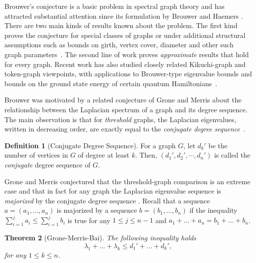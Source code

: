 \documentclass[10pt,reqno]{amsart}
\newtheorem{theorem}{Theorem}[section]
\theoremstyle{definition}
\newtheorem{definition}[theorem]{Definition}
\theoremstyle{remark}
\numberwithin{equation}{section}
\begin{document}
Brouwer's conjecture is a basic problem in spectral graph theory and has attracted substantial attention since its formulation by Brouwer and Haemers \cite{BrouwerHaemers2012,HaemersMohammadianTayfehRezaie2010}. There are two main kinds of results known about the problem. The first kind proves the conjecture for special classes of graphs\cite{HaemersMohammadianTayfehRezaie2010,FritscherHoppenRochaTrevisan2011,DuZhou2012,WangHuangLiu2012,Mayank2010,HelmbergTrevisan2017,TorresTrevisan2024} or under additional structural assumptions such as bounds on girth, vertex cover, diameter and other such graph parameters~\cite{GanieAlghamdiPirzada2016,Chen2018,Chen2019,GaniePirzadaRatherTrevisan2020,Cooper2021}. The second line of work proves \emph{approximate} results that hold for every graph\cite{Cooper2021,LewPartitionDensity2024,LewSumsDegrees2025,LewApproximate2026}. Recent work has also studied closely related Kikuchi-graph and token-graph viewpoints, with applications to Brouwer-type eigenvalue bounds and bounds on the ground state energy of certain quantum Hamiltonians~\cite{LewApproximate2026,BakshiBasuKothariLi2026}. 

Brouwer was motivated by a related conjecture of Grone and Merris about the relationship between the Laplacian spectrum of a graph and its degree sequence. The main observation is that for \emph{threshold} graphs, the Laplacian eigenvalues, written in decreasing order, are exactly equal to the \emph{conjugate degree sequence}~\cite{GroneMerrisSunder1990,Merris1994,HammerKelmans1996}. 

\begin{definition}[Conjugate Degree Sequence]
For a graph $G$, let $d_k'$ be the number of vertices in $G$ of degree at least $k$. Then, $(d_1', d_2', \cdots, d_n')$ is called the \emph{conjugate} degree sequence of $G$. 
\end{definition}

Grone and Merris conjectured that the threshold-graph comparison is an extreme case and that in fact for any graph the Laplacian eigenvalue sequence is \emph{majorized} by the conjugate degree sequence \cite{GroneMerris1994}. Recall that a sequence $a=(a_1,\ldots, a_n)$ is majorized by a sequence $b=(b_1,\ldots, b_n)$ if the inequality  $\displaystyle\sum_{i=1}^j a_i \leq \sum_{i=1}^j b_i$  is true for any $1\le j\le n-1$ and $a_1+\ldots+a_n=b_1+\ldots+b_n$.


\begin{theorem}[Grone-Merris-Bai]
The following inequality holds
$$\lambda_1+\ldots+\lambda_k\le d_1'+\ldots+d_k',$$
for any $1\le k\le n$. 
\end{theorem}
\end{document}
